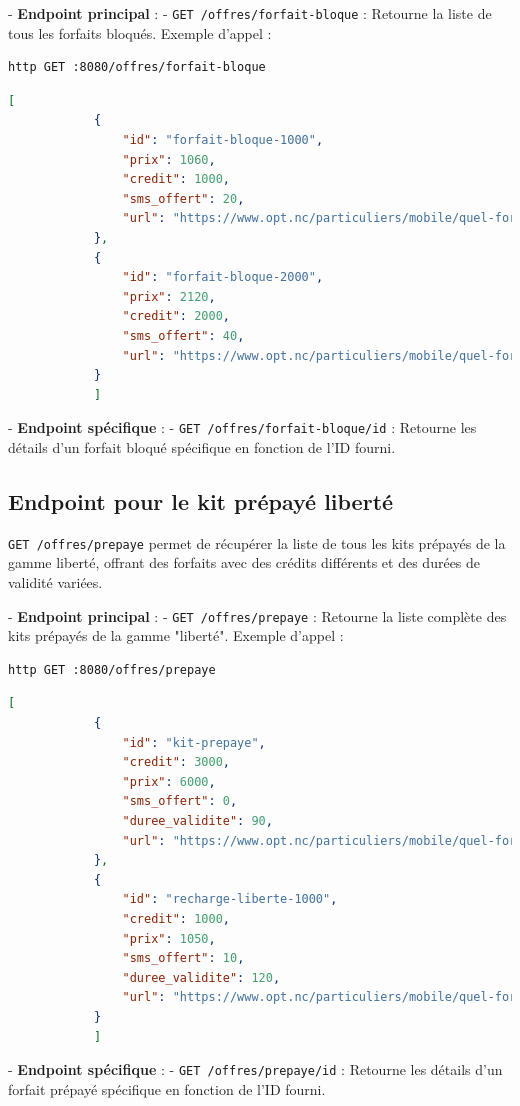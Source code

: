 \documentclass[11pt]{article}
\begin{document}
		- \textbf{Endpoint principal} :
		- \texttt{GET /offres/forfait-bloque} : Retourne la liste de tous les forfaits bloqués.
		Exemple d'appel :
		\begin{lstlisting}[language=bash]
			http GET :8080/offres/forfait-bloque
		\end{lstlisting}
		\begin{lstlisting}[language=JSON]
			[
			{
				"id": "forfait-bloque-1000",
				"prix": 1060,
				"credit": 1000,
				"sms_offert": 20,
				"url": "https://www.opt.nc/particuliers/mobile/quel-forfait-choisir/forfait-bloque-1000"
			},
			{
				"id": "forfait-bloque-2000",
				"prix": 2120,
				"credit": 2000,
				"sms_offert": 40,
				"url": "https://www.opt.nc/particuliers/mobile/quel-forfait-choisir/forfait-bloque-2000"
			}
			]
		\end{lstlisting}
		
		- \textbf{Endpoint spécifique} :
		- \texttt{GET /offres/forfait-bloque/{id}} : Retourne les détails d'un forfait bloqué spécifique en fonction de l'ID fourni.
		
		\subsection*{Endpoint pour le kit prépayé liberté}
		\texttt{GET /offres/prepaye} permet de récupérer la liste de tous les kits prépayés de la gamme liberté, offrant des forfaits avec des crédits différents et des durées de validité variées.
		
		- \textbf{Endpoint principal} :
		- \texttt{GET /offres/prepaye} : Retourne la liste complète des kits prépayés de la gamme "liberté".
		Exemple d'appel :
		\begin{lstlisting}[language=bash]
			http GET :8080/offres/prepaye
		\end{lstlisting}
		\begin{lstlisting}[language=JSON]
			[
			{
				"id": "kit-prepaye",
				"credit": 3000,
				"prix": 6000,
				"sms_offert": 0,
				"duree_validite": 90,
				"url": "https://www.opt.nc/particuliers/mobile/quel-forfait-choisir/kit-prepaye-liberte"
			},
			{
				"id": "recharge-liberte-1000",
				"credit": 1000,
				"prix": 1050,
				"sms_offert": 10,
				"duree_validite": 120,
				"url": "https://www.opt.nc/particuliers/mobile/quel-forfait-choisir/kit-prepaye-liberte"
			}
			]
		\end{lstlisting}
		
		- \textbf{Endpoint spécifique} :
		- \texttt{GET /offres/prepaye/{id}} : Retourne les détails d'un forfait prépayé spécifique en fonction de l'ID fourni.
\end{document}
